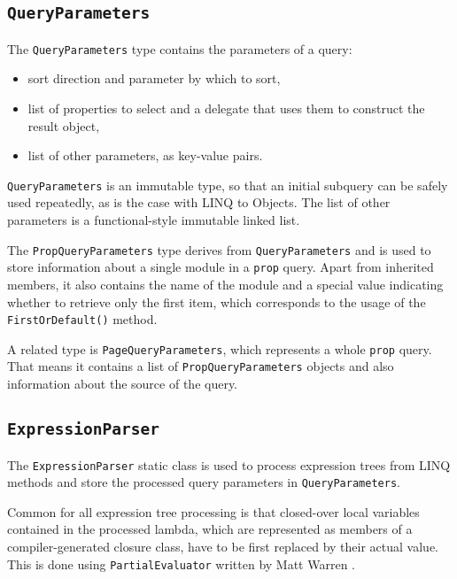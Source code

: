 
\subsection{\texorpdfstring{\lstinline{QueryParameters}}{QueryParameters}}

The \lstinline{QueryParameters} type contains the parameters of a query:

\begin{itemize}
\item sort direction and parameter by which to sort,
\item list of properties to select and a delegate that uses them to construct the result object,
\item list of other parameters, as key-value pairs.
\end{itemize}

\lstinline{QueryParameters} is an immutable type,
so that an initial subquery can be safely used repeatedly, as is the case with LINQ to Objects.
The list of other parameters is a functional-style immutable linked list.

\medskip

The \lstinline{PropQueryParameters} type derives from \lstinline{QueryParameters}
and is used to store information about a single module in a \texttt{prop} query.
Apart from inherited members, it also contains the name of the module
and a special value indicating whether to retrieve only the first item,
which corresponds to the usage of the \lstinline{FirstOrDefault()} method.

A related type is \lstinline{PageQueryParameters},
which represents a whole \texttt{prop} query.
That means it contains a list of \lstinline{PropQueryParameters} objects
and also information about the source of the query.

\subsection{\texorpdfstring{\lstinline{ExpressionParser}}{ExpressionParser}}

The \lstinline{ExpressionParser} static class is used to process expression trees from \ac{LINQ} methods
and store the processed query parameters in \lstinline{QueryParameters}.

Common for all expression tree processing is that closed-over local variables contained in the processed lambda,
which are represented as members of a compiler-generated closure class,
have to be first replaced by their actual value.
This is done using \lstinline{PartialEvaluator} written by Matt Warren \cite{warren}.


